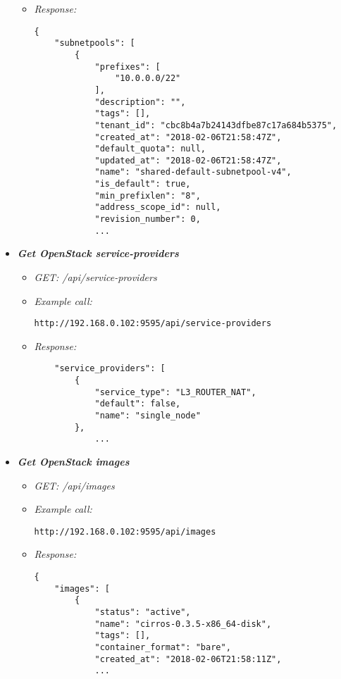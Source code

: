 \begin{itemize}
\begin{itemize}
\item \emph{Response:}
 \begin{lstlisting}
{
    "subnetpools": [
        {
            "prefixes": [
                "10.0.0.0/22"
            ],
            "description": "",
            "tags": [],
            "tenant_id": "cbc8b4a7b24143dfbe87c17a684b5375",
            "created_at": "2018-02-06T21:58:47Z",
            "default_quota": null,
            "updated_at": "2018-02-06T21:58:47Z",
            "name": "shared-default-subnetpool-v4",
            "is_default": true,
            "min_prefixlen": "8",
            "address_scope_id": null,
            "revision_number": 0,
            ...
\end{lstlisting}
\end{itemize}



\item \textbf{\textit{Get OpenStack service-providers}}
\begin{itemize}
\item \emph{GET: /api/service-providers}
\item \emph{Example call:}
 \begin{lstlisting}
http://192.168.0.102:9595/api/service-providers
\end{lstlisting}

\item \emph{Response:}
 \begin{lstlisting}
    "service_providers": [
        {
            "service_type": "L3_ROUTER_NAT",
            "default": false,
            "name": "single_node"
        },
            ...
\end{lstlisting}
\end{itemize}


\item \textbf{\textit{Get OpenStack images}}
\begin{itemize}
\item \emph{GET: /api/images}
\item \emph{Example call:}
 \begin{lstlisting}
http://192.168.0.102:9595/api/images
\end{lstlisting}

\item \emph{Response:}
 \begin{lstlisting}
{
    "images": [
        {
            "status": "active",
            "name": "cirros-0.3.5-x86_64-disk",
            "tags": [],
            "container_format": "bare",
            "created_at": "2018-02-06T21:58:11Z",
            ...
\end{lstlisting}
\end{itemize}


\end{itemize}

